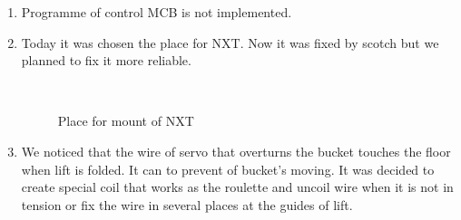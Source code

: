 \begin{enumerate}
\begin{enumerate}
		\item Programme of control MCB is not implemented.
		
		\item Today it was chosen the place for NXT. Now it was fixed by scotch but we planned to fix it more reliable.
		
		\begin{figure}[H]
			\begin{minipage}[h]{0.2\linewidth}
				\center  
			\end{minipage}
			\begin{minipage}[h]{0.6\linewidth}
				\caption{Place for mount of NXT}
			\end{minipage}
		\end{figure}
		
		\item We noticed that the wire of servo that overturns the bucket touches the floor when lift is folded. It can to prevent of bucket's moving. It was decided to create special coil that works as the roulette and uncoil wire when it is not in tension or fix the wire in several places at the guides of lift.
		

\end{enumerate}
\end{enumerate}
